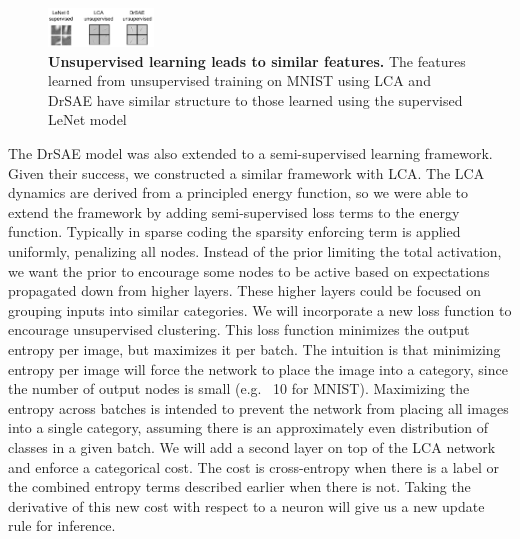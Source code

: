 \begin{figure}\label{fig:ch3_lenet_lca_drsae_weights}
    \centering
    \includegraphics[width=0.25\textwidth]{figures/lenet_lca_drsae_weights.png}
    \caption{\textbf{Unsupervised learning leads to similar features.} The features learned from unsupervised training on MNIST using LCA \parencite{rozell2008sparse} and DrSAE \parencite{rolfe2013discriminative} have similar structure to those learned using the supervised LeNet model \parencite{lecun1998gradient}}
\end{figure}

The DrSAE model was also extended to a semi-supervised learning framework. Given their success, we constructed a similar framework with LCA. The LCA dynamics are derived from a principled energy function, so we were able to extend the framework by adding semi-supervised loss terms to the energy function. Typically in sparse coding the sparsity enforcing term is applied uniformly, penalizing all nodes. Instead of the prior limiting the total activation, we want the prior to encourage some nodes to be active based on expectations propagated down from higher layers. These higher layers could be focused on grouping inputs into similar categories. We will incorporate a new loss function to encourage unsupervised clustering. This loss function minimizes the output entropy per image, but maximizes it per batch. The intuition is that minimizing entropy per image will force the network to place the image into a category, since the number of output nodes is small (e.g. ~10 for MNIST). Maximizing the entropy across batches is intended to prevent the network from placing all images into a single category, assuming there is an approximately even distribution of classes in a given batch. We will add a second layer on top of the LCA network and enforce a categorical cost. The cost is cross-entropy when there is a label or the combined entropy terms described earlier when there is not. Taking the derivative of this new cost with respect to a neuron will give us a new update rule for inference.

